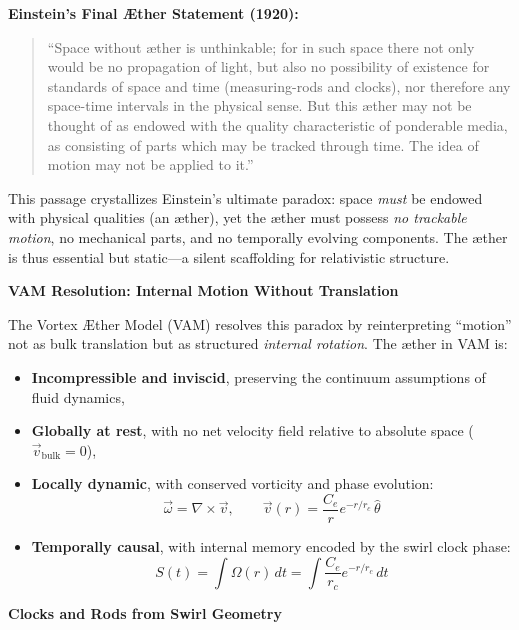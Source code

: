 \documentclass[preprint]{revtex4-2}
\begin{document}
    \noindent
    \textbf{Einstein’s Final Æther Statement (1920):}
    \begin{quote}
        “Space without æther is unthinkable; for in such space there not only would be no propagation of light, but also no possibility of existence for standards of space and time (measuring-rods and clocks), nor therefore any space-time intervals in the physical sense. But this æther may not be thought of as endowed with the quality characteristic of ponderable media, as consisting of parts which may be tracked through time. The idea of motion may not be applied to it.”
    \end{quote}

    \noindent
    This passage crystallizes Einstein’s ultimate paradox: space \emph{must} be endowed with physical qualities (an æther), yet the æther must possess \emph{no trackable motion}, no mechanical parts, and no temporally evolving components. The æther is thus essential but static—a silent scaffolding for relativistic structure.

    \vspace{0.5em}
    \noindent
    \textbf{VAM Resolution: Internal Motion Without Translation}

    The Vortex Æther Model (VAM) resolves this paradox by reinterpreting “motion” not as bulk translation but as structured \emph{internal rotation}. The æther in VAM is:
    \begin{itemize}
        \item \textbf{Incompressible and inviscid}, preserving the continuum assumptions of fluid dynamics,
        \item \textbf{Globally at rest}, with no net velocity field relative to absolute space (\( \vec{v}_{\text{bulk}} = 0 \)),
        \item \textbf{Locally dynamic}, with conserved vorticity and phase evolution:
        \[
            \vec{\omega} = \nabla \times \vec{v}, \qquad \vec{v}(r) = \frac{C_e}{r} e^{-r/r_c} \, \hat{\theta}
        \]
        \item \textbf{Temporally causal}, with internal memory encoded by the swirl clock phase:
        \[
            S(t) = \int \Omega(r) \, dt = \int \frac{C_e}{r_c} e^{-r/r_c} \, dt
        \]
    \end{itemize}

    \vspace{0.5em}
    \noindent
    \textbf{Clocks and Rods from Swirl Geometry}
\end{document}
